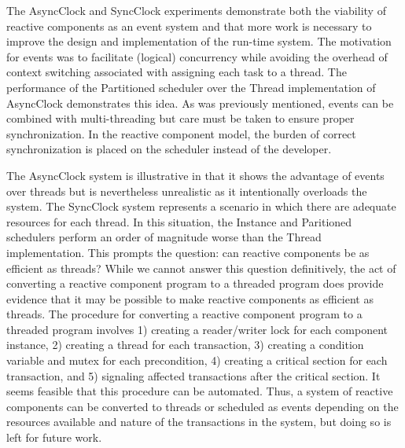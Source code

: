 The AsyncClock and SyncClock experiments demonstrate both the viability of reactive components as an event system and that more work is necessary to improve the design and implementation of the run-time system.
The motivation for events was to facilitate (logical) concurrency while avoiding the overhead of context switching associated with assigning each task to a thread.
The performance of the Partitioned scheduler over the Thread implementation of AsyncClock demonstrates this idea.
As was previously mentioned, events can be combined with multi-threading but care must be taken to ensure proper synchronization.
In the reactive component model, the burden of correct synchronization is placed on the scheduler instead of the developer.

The AsyncClock system is illustrative in that it shows the advantage of events over threads but is nevertheless unrealistic as it intentionally overloads the system.
The SyncClock system represents a scenario in which there are adequate resources for each thread.
In this situation, the Instance and Paritioned schedulers perform an order of magnitude worse than the Thread implementation.
This prompts the question:  can reactive components be as efficient as threads?
While we cannot answer this question definitively, the act of converting a reactive component program to a threaded program does provide evidence that it may be possible to make reactive components as efficient as threads.
The procedure for converting a reactive component program to a threaded program involves 1) creating a reader/writer lock for each component instance, 2) creating a thread for each transaction, 3) creating a condition variable and mutex for each precondition, 4) creating a critical section for each transaction, and 5) signaling affected transactions after the critical section.
It seems feasible that this procedure can be automated.
Thus, a system of reactive components can be converted to threads or scheduled as events depending on the resources available and nature of the transactions in the system, but doing so is left for future work.


